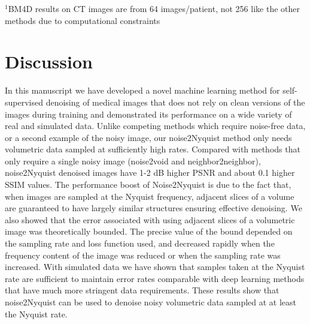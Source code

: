 \documentclass[12pt]{spieman}
\begin{document}
\begin{spacing}{2}
\begin{table}[htb]
\begin{center}
{\begin{tabular}{rccccccc}
	\bottomrule
	\end{tabular}}
	\end{center}
	\footnotesize{$^1$BM4D results on CT images are from 64 images/patient, not 256 like the other methods due to computational constraints}
\end{table}

\section{Discussion}
In this manuscript we have developed a novel machine learning method for self-supervised denoising of medical images that does not rely on clean versions of the images during training and demonstrated its performance on a wide variety of real and simulated data. Unlike competing methods which require noise-free data, or a second example of the noisy image, our noise2Nyquist method only needs volumetric data sampled at sufficiently high rates. Compared with methods that only require a single noisy image (noise2void and neighbor2neighbor), noise2Nyquist denoised images have 1-2 dB higher PSNR and about 0.1 higher SSIM values. The performance boost of Noise2Nyquist is due to the fact that, when images are sampled at the Nyquist frequency, adjacent slices of a volume are guaranteed to have largely similar structures ensuring effective denoising. We also showed that the error associated with using adjacent slices of a volumetric image was theoretically bounded. The precise value of the bound depended on the sampling rate and loss function used, and decreased rapidly when the frequency content of the image was reduced or when the sampling rate was increased. With simulated data we have shown that samples taken at the Nyquist rate are sufficient to maintain error rates comparable with deep learning methods that have much more stringent data requirements. These results show that noise2Nyquist can be used to denoise noisy volumetric data sampled at at least the Nyquist rate.


\end{spacing}
\end{document}
